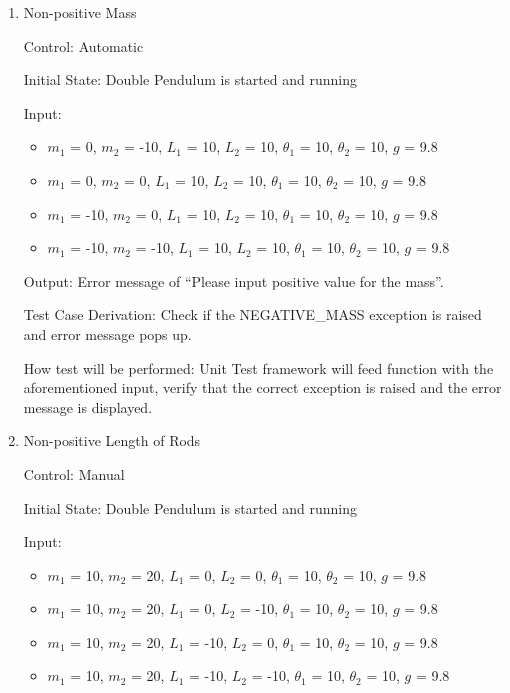 \documentclass[12pt, titlepage]{article}
\begin{document}
\begin{enumerate}
					
\item{Non-positive Mass}

Control: Automatic
					
Initial State: Double Pendulum is started and running
					
Input: 
\begin{itemize}
\item $m_1$ = 0, $m_2$ = -10, $L_1$ = 10, $L_2$ = 10, $\theta_1$ = 10, $\theta_2$ = 10, $g$ = 9.8
\item $m_1$ = 0, $m_2$ = 0, $L_1$ = 10, $L_2$ = 10, $\theta_1$ = 10, $\theta_2$ = 10, $g$ = 9.8
\item $m_1$ = -10, $m_2$ = 0, $L_1$ = 10, $L_2$	= 10, $\theta_1$ = 10, $\theta_2$ = 10, $g$ = 9.8
\item $m_1$ = -10, $m_2$ = -10, $L_1$ = 10, $L_2$ = 10, $\theta_1$ = 10, $\theta_2$ = 10, $g$ = 9.8

\end{itemize}

Output: Error message of ``Please input positive value for the mass''.  

Test Case Derivation: Check if the NEGATIVE\_MASS exception is raised and error message pops up. 

How test will be performed: Unit Test framework will feed function with the aforementioned input, verify that the correct exception is raised and the error message is displayed.   

\item{Non-positive Length of Rods}  

Control: Manual 
          
Initial State: Double Pendulum is started and running
          
Input: 
\begin{itemize}
\item $m_1$ = 10, $m_2$ = 20, $L_1$ = 0, $L_2$ = 0, $\theta_1$ = 10, $\theta_2$ = 10, $g$ = 9.8
\item $m_1$ = 10, $m_2$ = 20, $L_1$ = 0, $L_2$ = -10, $\theta_1$ = 10, $\theta_2$ = 10, $g$ = 9.8
\item $m_1$ = 10, $m_2$ = 20, $L_1$ = -10, $L_2$ = 0, $\theta_1$ = 10, $\theta_2$ = 10, $g$ = 9.8
\item $m_1$ = 10, $m_2$ = 20, $L_1$ = -10, $L_2$ = -10, $\theta_1$ = 10, $\theta_2$ = 10, $g$ = 9.8


\end{itemize}
\end{enumerate}
\end{document}
